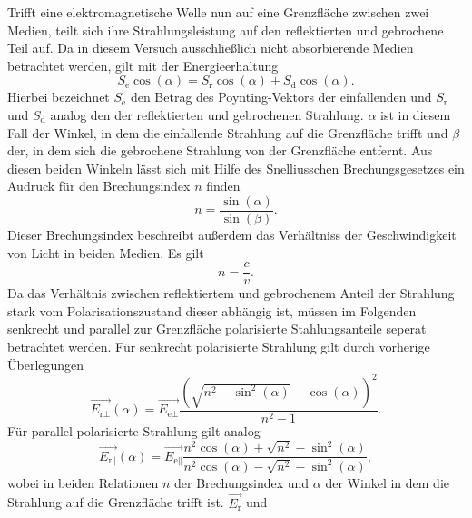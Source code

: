 \noindent
Trifft eine elektromagnetische Welle nun auf eine Grenzfläche zwischen zwei Medien, teilt sich ihre Strahlungsleistung auf den reflektierten und gebrochene Teil auf.
Da in diesem Versuch ausschließlich nicht absorbierende Medien betrachtet werden, gilt mit der Energieerhaltung
\begin{equation}
    S_\text{e} \cos(\alpha) = S_\text{r} \cos(\alpha) + S_\text{d} \cos(\alpha).
\end{equation}
Hierbei bezeichnet $S_\text{e}$ den Betrag des Poynting-Vektors der einfallenden und $S_\text{r}$ und $S_\text{d}$ analog den der reflektierten und gebrochenen Strahlung.
$\alpha$ ist in diesem Fall der Winkel, in dem die einfallende Strahlung auf die Grenzfläche trifft und $\beta$ der, in dem sich die gebrochene Strahlung von der Grenzfläche
entfernt.
\newline
Aus diesen beiden Winkeln lässt sich mit Hilfe des Snelliusschen Brechungsgesetzes ein Audruck für den Brechungsindex $n$ finden
\begin{equation}
    n = \frac{\sin(\alpha)}{\sin(\beta)}.
\end{equation}
Dieser Brechungsindex beschreibt außerdem das Verhältniss der Geschwindigkeit von Licht in beiden Medien. Es gilt
\begin{equation}
    n = \frac{c}{v}.
\end{equation}
\newline\newline
Da das Verhältnis zwischen reflektiertem und gebrochenem Anteil der Strahlung stark vom Polarisationszustand dieser abhängig ist, müssen im Folgenden senkrecht und
parallel zur Grenzfläche polarisierte Stahlungsanteile seperat betrachtet werden.
Für senkrecht polarisierte Strahlung gilt durch vorherige Überlegungen
\begin{equation}
    \vec{E_{\text{r}\perp}}(\alpha) = \vec{E_{\text{e}\perp}} \frac{(\sqrt{n^2 - \sin^2(\alpha)} - \cos(\alpha))^2}{n^2 - 1}.
    \label{eqn:fresnelsenk}
\end{equation}
Für parallel polarisierte Strahlung gilt analog
\begin{equation}
    \vec{E_{\text{r}\parallel}}(\alpha) = \vec{E_{\text{e}\parallel}} \frac{n^2 \cos(\alpha) + \sqrt{n^2} - \sin^2(\alpha)}{n^2 \cos(\alpha) - \sqrt{n^2} - \sin^2(\alpha)},
    \label{eqn:fresnelpara}
\end{equation}
wobei in beiden Relationen $n$ der Brechungsindex und $\alpha$ der Winkel in dem die Strahlung auf die Grenzfläche trifft ist. $\vec{E_{\text{r}}}$ und
